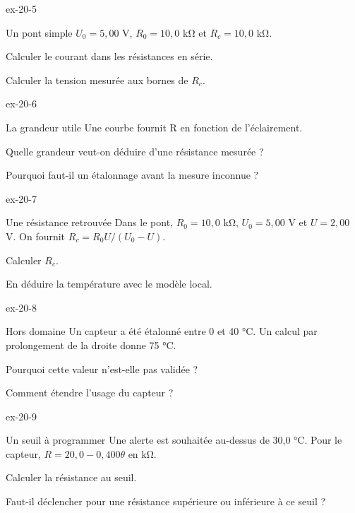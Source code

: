 \begin{blocLivre}{ex-20-5}\begin{exercice}[2]{Un pont simple}
$U_0=5,00$ V, $R_0=10,0$ kΩ et $R_c=10,0$ kΩ.
\begin{questions}
\item Calculer le courant dans les résistances en série.
\item Calculer la tension mesurée aux bornes de $R_c$.
\end{questions}
\end{exercice}\end{blocLivre}
\begin{blocLivre}{ex-20-6}\begin{exercice}[2]{La grandeur utile}
Une courbe fournit R en fonction de l’éclairement.
\begin{questions}
\item Quelle grandeur veut-on déduire d’une résistance mesurée ?
\item Pourquoi faut-il un étalonnage avant la mesure inconnue ?
\end{questions}
\end{exercice}\end{blocLivre}
\begin{blocLivre}{ex-20-7}\begin{exercice}[2]{Une résistance retrouvée}
Dans le pont, $R_0=10,0$ kΩ, $U_0=5,00$ V et $U=2,00$ V. On fournit $R_c=R_0U/(U_0-U)$.
\begin{questions}
\item Calculer $R_c$.
\item En déduire la température avec le modèle local.
\end{questions}
\end{exercice}\end{blocLivre}
\begin{blocLivre}{ex-20-8}\begin{exercice}[2]{Hors domaine}
Un capteur a été étalonné entre 0 et 40 °C. Un calcul par prolongement de la droite donne 75 °C.
\begin{questions}
\item Pourquoi cette valeur n’est-elle pas validée ?
\item Comment étendre l’usage du capteur ?
\end{questions}
\end{exercice}\end{blocLivre}
\begin{blocLivre}{ex-20-9}\begin{exercice}[3]{Un seuil à programmer}
Une alerte est souhaitée au-dessus de 30,0 °C. Pour le capteur, $R=20,0-0,400\theta$ en kΩ.
\begin{questions}
\item Calculer la résistance au seuil.
\item Faut-il déclencher pour une résistance supérieure ou inférieure à ce seuil ?
\end{questions}
\end{exercice}\end{blocLivre}
